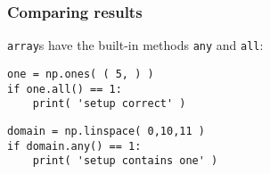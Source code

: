 \documentclass[11pt]{beamer}
\begin{document}
\begin{frame}[fragile]
  \frametitle{Comparing results}
  \Enlarge

  \begin{enumerate}
  \myitem  \texttt{array}s have the built-in methods \texttt{any} and \texttt{all}:
  \begin{Verbatim}
one = np.ones( ( 5, ) )
if one.all() == 1:
    print( 'setup correct' )
  \end{Verbatim}
  \pause
  \begin{Verbatim}[commandchars=\\\{\},commentchar=\%]
domain = np.linspace( 0,10,11 )
if domain.any() == 1:
    print( 'setup contains one' )
  \end{Verbatim}
  \end{enumerate}
\end{frame}

\fi
\end{document}
